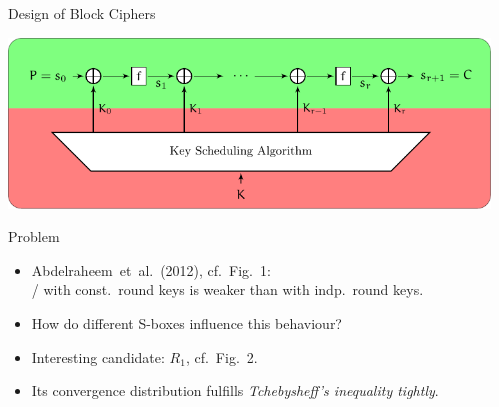 \begin{columns}[t]
\begin{column}{\sepwid}\end{column}\begin{column}{\onecolwid}

\begin{alertblock}{Design of Block Ciphers}
	\begin{center}
			\includegraphics[keepaspectratio,width=\textwidth]{figures/motivation/plot.pdf}
	\end{center}

%
\end{alertblock}

\begin{block}{Problem}
	\begin{itemize}
		\item Abdelraheem~et~al.\ (2012), cf.\ Fig.~1:\\
			\present/ with const.\ round keys is weaker than with indp.\ round keys.
		\item How do different S-boxes influence this behaviour?
		\item Interesting candidate: $R_1$, cf.\ Fig.~2.
		\item Its convergence distribution fulfills \emph{Tchebysheff's inequality tightly}.
	\end{itemize}
\end{block}


\end{column}
\end{columns}

